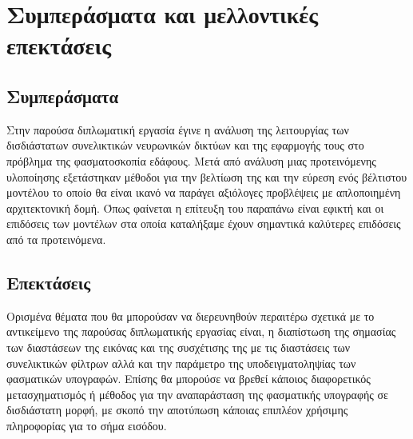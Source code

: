 \chapter{Συμπεράσματα και μελλοντικές επεκτάσεις}
\label{ch:conclusions}
\section{Συμπεράσματα}
Στην παρούσα διπλωματική εργασία έγινε η ανάλυση της λειτουργίας των δισδιάστατων συνελικτικών νευρωνικών δικτύων και της εφαρμογής τους στο πρόβλημα της φασματοσκοπία εδάφους. Μετά από ανάλυση μιας προτεινόμενης υλοποίησης εξετάστηκαν μέθοδοι για την βελτίωση της και την εύρεση ενός βέλτιστου μοντέλου το οποίο θα είναι ικανό να παράγει αξιόλογες προβλέψεις με απλοποιημένη αρχιτεκτονική δομή. Όπως φαίνεται η επίτευξη του παραπάνω είναι εφικτή και οι επιδόσεις των μοντέλων στα οποία καταλήξαμε έχουν σημαντικά καλύτερες επιδόσεις από τα προτεινόμενα.

\section{Επεκτάσεις}
Ορισμένα θέματα που θα μπορούσαν να διερευνηθούν περαιτέρω σχετικά με το αντικείμενο της παρούσας διπλωματικής εργασίας είναι, η διαπίστωση της σημασίας των διαστάσεων της εικόνας και της συσχέτισης της με τις διαστάσεις των συνελικτικών φίλτρων αλλά και την παράμετρο της υποδειγματοληψίας των φασματικών υπογραφών. Επίσης θα μπορούσε να βρεθεί κάποιος διαφορετικός μετασχηματισμός ή μέθοδος για την αναπαράσταση της φασματικής υπογραφής σε δισδιάστατη μορφή, με σκοπό την αποτύπωση κάποιας επιπλέον χρήσιμης πληροφορίας για το σήμα εισόδου.